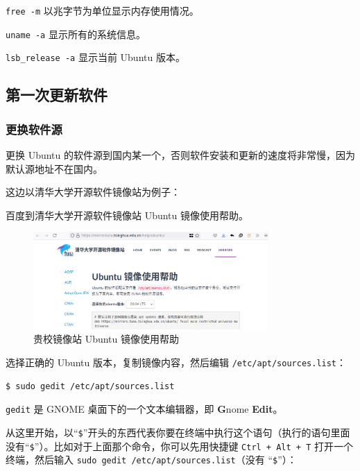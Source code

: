 \documentclass[UTF-8]{ctexart}
\begin{document}
				\texttt{free -m} 以兆字节为单位显示内存使用情况。
				
				\texttt{uname -a} 显示所有的系统信息。
				
				\texttt{lsb\_release -a} 显示当前 Ubuntu 版本。
				
				
	
		\subsection{第一次更新软件}
		
			\subsubsection{更换软件源}
		
				更换 Ubuntu 的软件源到国内某一个，否则软件安装和更新的速度将非常慢，因为默认源地址不在国内。
				
				这边以清华大学开源软件镜像站为例子：
				
				百度到清华大学开源软件镜像站 Ubuntu 镜像使用帮助。
					
				\begin{figure}[H]
					\centering
					\includegraphics[width=0.8\textwidth]{fig/ubuntu_mirror_help.png}
					\caption*{贵校镜像站 Ubuntu 镜像使用帮助}
				\end{figure}
			
				选择正确的 Ubuntu 版本，复制镜像内容，然后编辑 \texttt{/etc/apt/sources.list}：
	
				\begin{verbatim}
$ sudo gedit /etc/apt/sources.list
				\end{verbatim}
			
				\texttt{gedit} 是 GNOME 桌面下的一个文本编辑器，即 \textbf{G}nome \textbf{Edit}。
				
				从这里开始，以“\texttt{\$}”开头的东西代表你要在终端中执行这个语句（执行的语句里面没有“\texttt{\$}”）。比如对于上面那个命令，你可以先用快捷键 \texttt{Ctrl + Alt + T} 打开一个终端，然后输入 \texttt{sudo gedit /etc/apt/sources.list}（没有 “\texttt{\$}”）：
	
\end{document}
